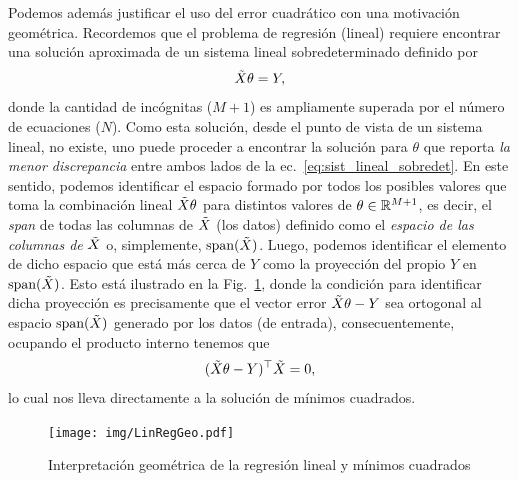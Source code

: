 Podemos además justificar el uso del error cuadrático con una motivación geométrica. Recordemos que el problema de regresión (lineal) requiere encontrar una solución aproximada de un sistema lineal sobredeterminado definido por 
\begin{equation}
	\tilde{X} \theta = Y,\label{eq:sist_lineal_sobredet}
\end{equation}
donde la cantidad de incógnitas ($M+1$) es ampliamente superada por el número de ecuaciones ($N$). Como esta solución, desde el punto de vista de un sistema lineal, no existe, uno puede proceder a encontrar la solución para $\theta$ que reporta \emph{la menor discrepancia} entre ambos lados de la ec.~\eqref{eq:sist_lineal_sobredet}. En este sentido, podemos identificar el espacio formado por todos los posibles valores que toma la combinación lineal $\tilde{X} \theta$ para distintos valores de $\theta\in{\mathbb R}^{M+1}$, es decir, el \emph{span} de todas las columnas de $\tilde{X}$ (los datos) definido como el \emph{espacio de las columnas de} $\tilde{X}$ o, simplemente, $\text{span}(\tilde{X})$. Luego, podemos identificar el elemento de dicho espacio que está más cerca de $Y$  como la proyección del propio $Y$ en $\text{span}(\tilde{X})$. Esto está ilustrado en la Fig.~\ref{fig:projection}, donde la condición para identificar dicha proyección es  precisamente que el vector error $\tilde{X} \theta- Y$ sea ortogonal al espacio  $\text{span}(\tilde{X})$ generado por los datos (de entrada), consecuentemente, ocupando el producto interno tenemos que 
\begin{equation}
	(\tilde{X} \theta- Y)^\top \tilde{X} = 0,
\end{equation}
lo cual nos lleva directamente a la solución de mínimos cuadrados. 

\begin{figure}[t]
	\centering
	\texttt{[image: img/LinRegGeo.pdf]}\\
	\caption{Interpretación geométrica de la regresión lineal y mínimos cuadrados}
	\label{fig:projection}
\end{figure}

